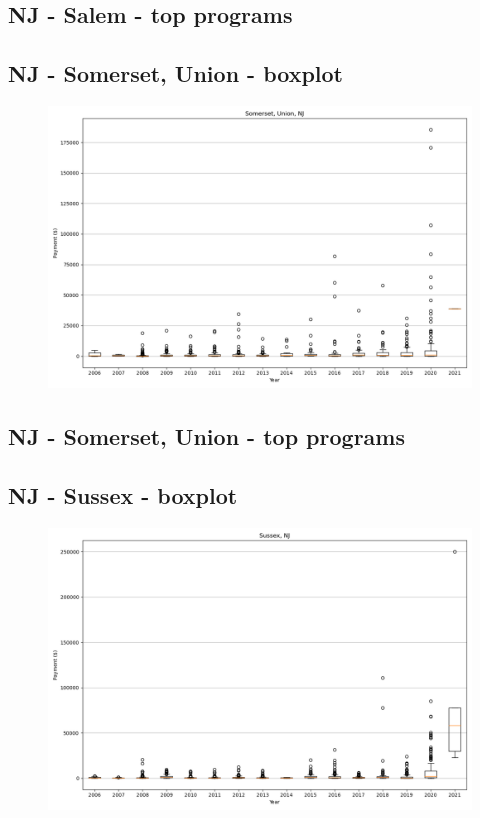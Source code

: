 \subsection*{NJ - Salem - top programs}

\newpage
\subsection*{NJ - Somerset, Union - boxplot}
\begin{figure}[h]
\centering
\includegraphics[width=7in]{../output/boxplots/counties/Somerset, Union-NJ_boxplot.png}
\end{figure}


\subsection*{NJ - Somerset, Union - top programs}

\newpage
\subsection*{NJ - Sussex - boxplot}
\begin{figure}[h]
\centering
\includegraphics[width=7in]{../output/boxplots/counties/Sussex-NJ_boxplot.png}
\end{figure}


